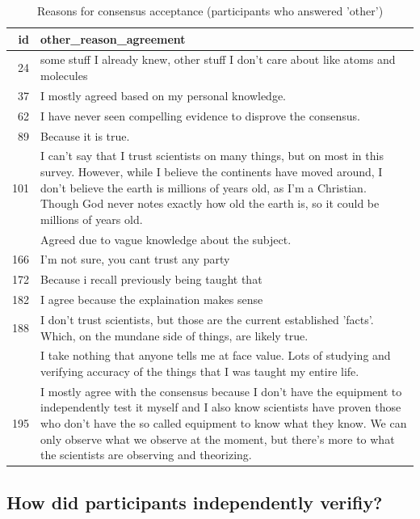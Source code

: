 \documentclass[
  doc,floatsintext]{apa6}
\begin{document}
\begin{longtable}[t]{>{}r>{\raggedright\arraybackslash}p{30em}}
\caption{\label{tab:exp3-other-reasons-acceptance}Reasons for consensus acceptance (participants who answered 'other')}\\
\toprule
id & other\_reason\_agreement\\
\midrule
24 & some stuff I already knew, other stuff I don't care about like atoms and molecules\\
37 & I mostly agreed based on my personal knowledge.\\
62 & I have never seen compelling evidence to disprove the consensus.\\
89 & Because it is true.\\
101 & I can't say that I trust scientists on many things, but on most in this survey. However, while I believe the continents have moved around, I don't believe the earth is millions of years old, as I'm a Christian. Though God never notes exactly how old the earth is, so it could be millions of years old.\\
\addlinespace
102 & Agreed due to vague knowledge about the subject.\\
166 & I'm not sure, you cant trust any party\\
172 & Because i recall previously being taught that\\
182 & I agree because the explaination makes sense\\
188 & I don't trust scientists, but those are the current established 'facts'. Which, on the mundane side of things, are likely true.\\
\addlinespace
189 & I take nothing that anyone tells me at face value. Lots of studying and verifying accuracy of the things that I was taught my entire life.\\
195 & I mostly agree with the consensus because I don't have the equipment to independently test it myself and I also know scientists have proven those who don't have the so called equipment to know what they know. We can only observe what we observe at the moment, but there's more to what the scientists are observing and theorizing.\\
\bottomrule
\end{longtable}

\subsection{How did participants independently verifiy?}\label{how-did-participants-independently-verifiy}
\end{document}
